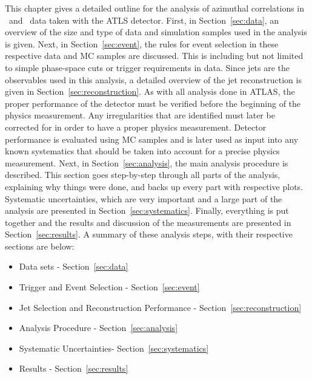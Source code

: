 
This chapter gives a detailed outline for the analysis of azimuthal correlations in \pp\ and \pPb\ data taken with the ATLS detector. First, in Section~\ref{sec:data}, an overview of the size and type of data and simulation samples used in the analysis is given. Next, in Section~\ref{sec:event}, the rules for event selection in these respective data and MC samples are discussed. This is including but not limited to simple phase-space cuts or trigger requirements in data. Since jets are the observables used in this analysis, a detailed overview of the jet reconstruction is given in Section~\ref{sec:reconstruction}. As with all analysis done in ATLAS, the proper performance of the detector must be verified before the beginning of the physics measurement. Any irregularities that are identified must later be corrected for in order to have a proper physics measurement. Detector performance is evaluated using MC samples and is later used as input into any known systematics that should be taken into account for a precise physics measurement. Next, in Section~\ref{sec:analysis}, the main analysis procedure is described. This section goes step-by-step through all parts of the analysis, explaining why things were done, and backs up every part with respective plots. Systematic uncertainties, which are very important and a large part of the analysis are presented in Section~\ref{sec:systematics}. Finally, everything is put together and the results and discussion of the measurements are presented in Section~\ref{sec:results}. A summary of these analysis steps, with their respective sections are below:

\begin{itemize}
	\item Data sets - Section~\ref{sec:data}
	\item Trigger and Event Selection - Section~\ref{sec:event}
	\item Jet Selection and Reconstruction Performance - Section~\ref{sec:reconstruction}
	\item Analysis Procedure - Section~\ref{sec:analysis}
	\item Systematic Uncertainties- Section~\ref{sec:systematics}
	\item Results - Section~\ref{sec:results} 
\end{itemize}

\newpage
